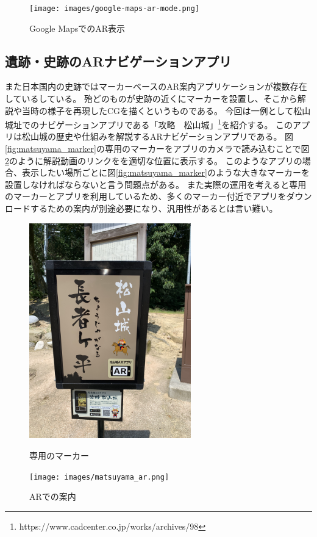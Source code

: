 \begin{figure}[h]
  \begin{center}
      \texttt{[image: images/google-maps-ar-mode.png]}
  \end{center}
  \caption{Google MapsでのAR表示} \label{fig:googleMapAr}
\end{figure}

\subsection{遺跡・史跡のARナビゲーションアプリ}
また日本国内の史跡ではマーカーベースのAR案内アプリケーションが複数存在しているしている。
殆どのものが史跡の近くにマーカーを設置し、そこから解説や当時の様子を再現したCGを描くというものである。
今回は一例として松山城址でのナビゲーションアプリである「攻略　松山城」\footnote{\textsf{https://www.cadcenter.co.jp/works/archives/98}}を紹介する。
このアプリは松山城の歴史や仕組みを解説するARナビゲーションアプリである。
図\ref{fig:matsuyama_marker}の専用のマーカーをアプリのカメラで読み込むことで図\ref{fig:matsuyama_ar}のように解説動画のリンクをを適切な位置に表示する。
このようなアプリの場合、表示したい場所ごとに図\ref{fig:matsuyama_marker}のような大きなマーカーを設置しなければならないと言う問題点がある。
また実際の運用を考えると専用のマーカーとアプリを利用しているため、多くのマーカー付近でアプリをダウンロードするための案内が別途必要になり、汎用性があるとは言い難い。


\begin{figure}[h]
  \begin{minipage}{0.5\hsize}
    \centering
    \includegraphics[width=70mm]{images/matsuyama_marker.jpg}
    \caption{専用のマーカー} \label{fig:matsuyama_marker}
  \end{minipage}
  \begin{minipage}{0.5\hsize}
    \centering
    \texttt{[image: images/matsuyama\_ar.png]}
    \caption{ARでの案内} \label{fig:matsuyama_ar}
  \end{minipage}
\end{figure}


